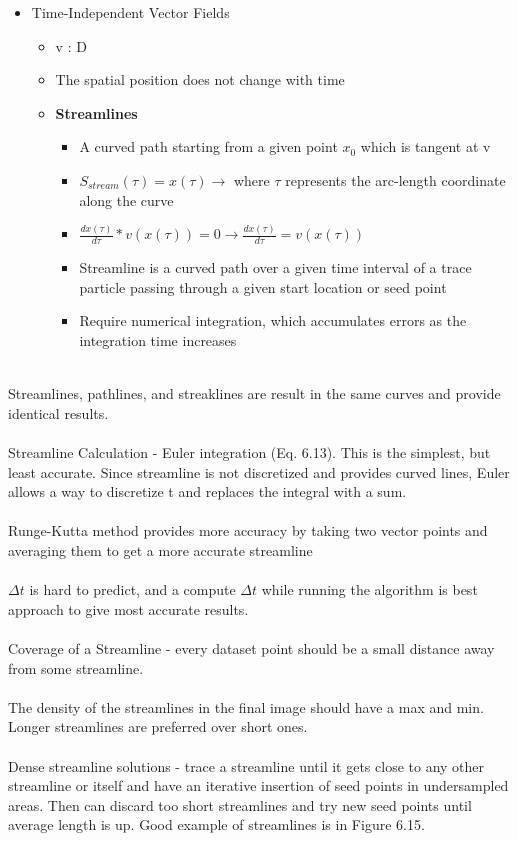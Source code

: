 \documentclass{article}
\begin{document}
\begin{itemize}
    \item Time-Independent Vector Fields 
    \begin{itemize}
        \item v : D
        \item The spatial position does not change with time
        \item \textbf{Streamlines} %
        \begin{itemize}
            \item A curved path starting from a given point $x_0$ which is tangent at v
            \item $S_{stream}(\tau) = x(\tau) \rightarrow$ where $\tau$ represents the arc-length coordinate along the curve
            \item $\frac{dx(\tau)}{d\tau} * v(x(\tau)) = 0 \rightarrow \frac{dx(\tau)}{d\tau} = v(x(\tau))$
            \item Streamline is a curved path over a given time interval of a trace particle passing through a given start location or seed point
            \item Require numerical integration, which accumulates errors as the integration time increases
        \end{itemize}
    \end{itemize} 
\end{itemize}
\\
Streamlines, pathlines, and streaklines are result in the same curves and provide identical results.
\\\\
Streamline Calculation - Euler integration (Eq. 6.13). This is the simplest, but least accurate. Since streamline is not discretized and provides curved lines, Euler allows a way to discretize t and replaces the integral with a sum.
\\\\
Runge-Kutta method provides more accuracy by taking two vector points and averaging them to get a more accurate streamline
\\\\
$\Delta t$ is hard to predict, and a compute $\Delta t$ while running the algorithm is best approach to give most accurate results.
\\\\
Coverage of a Streamline - every dataset point should be a small distance away from some streamline. 
\\\\
The density of the streamlines in the final image should have a max and min. Longer streamlines are preferred over short ones.
\\\\
Dense streamline solutions - trace a streamline until it gets close to any other streamline or itself and have an iterative insertion of seed points in undersampled areas. Then can discard too short streamlines and try new seed points until average length is up. Good example of streamlines is in Figure 6.15.
\end{document}
